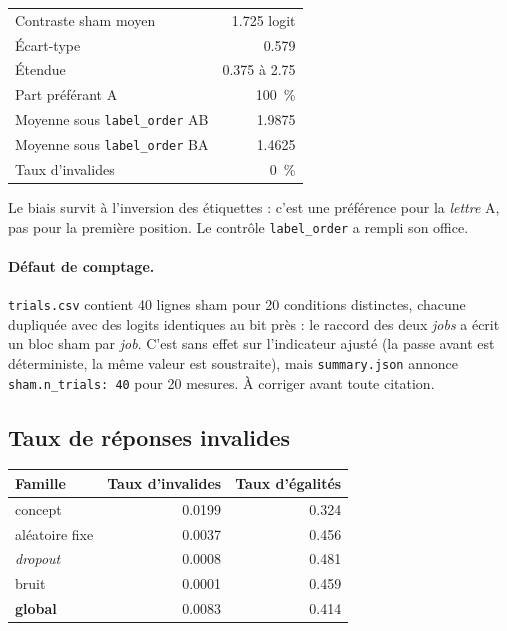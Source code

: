 \documentclass[11pt,a4paper]{article}
\newcommand{\code}[1]{\texttt{\small #1}}
\begin{document}
\begin{center}
\begin{tabular}{lr}
\toprule
Contraste sham moyen & \num{1.725} logit \\
Écart-type & \num{0.579} \\
Étendue & \num{0.375} à \num{2.75} \\
Part préférant A & \SI{100}{\percent} \\
Moyenne sous \code{label\_order} AB & \num{1.9875} \\
Moyenne sous \code{label\_order} BA & \num{1.4625} \\
Taux d'invalides & \SI{0}{\percent} \\
\bottomrule
\end{tabular}
\end{center}

\noindent
Le biais survit à l'inversion des étiquettes : c'est une préférence pour la
\emph{lettre} A, pas pour la première position. Le contrôle \code{label\_order} a rempli
son office.

\paragraph{Défaut de comptage.} \code{trials.csv} contient \num{40} lignes sham pour
\num{20} conditions distinctes, chacune dupliquée avec des logits identiques au bit près :
le raccord des deux \emph{jobs} a écrit un bloc sham par \emph{job}. C'est sans effet sur
l'indicateur ajusté (la passe avant est déterministe, la même valeur est soustraite), mais
\code{summary.json} annonce \code{sham.n\_trials: 40} pour \num{20} mesures. À corriger
avant toute citation.

\subsection{Taux de réponses invalides}

\begin{center}
\begin{tabular}{lrr}
\toprule
Famille & Taux d'invalides & Taux d'égalités \\
\midrule
concept          & \num{0.0199} & \num{0.324} \\
aléatoire fixe   & \num{0.0037} & \num{0.456} \\
\emph{dropout}   & \num{0.0008} & \num{0.481} \\
bruit            & \num{0.0001} & \num{0.459} \\
\midrule
\textbf{global}  & \num{0.0083} & \num{0.414} \\
\bottomrule
\end{tabular}
\end{center}
\end{document}
